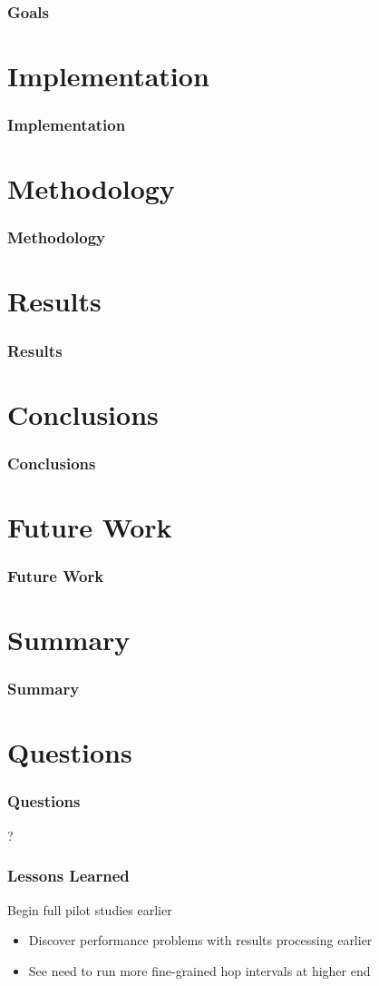 \documentclass{beamer}
\begin{document}
\begin{frame}
	\frametitle{Goals}

\end{frame}

\section{Implementation}
\begin{frame}
	\frametitle{Implementation}

\end{frame}

\section{Methodology}
\begin{frame}
	\frametitle{Methodology}

\end{frame}

\section{Results}
\begin{frame}
	\frametitle{Results}

\end{frame}

\section{Conclusions}
\begin{frame}
	\frametitle{Conclusions}

\end{frame}

\section{Future Work}
\begin{frame}
	\frametitle{Future Work}

\end{frame}

\section{Summary}
\begin{frame}
	\frametitle{Summary}
	\tableofcontents
\end{frame}

\section{Questions}
\begin{frame}
	\frametitle{Questions}
	? 
\end{frame}

\begin{frame}
	\frametitle{Lessons Learned}
	Begin full pilot studies earlier
	\begin{itemize}
	\item Discover performance problems with results processing earlier
	\item See need to run more fine-grained hop intervals at higher end
	\end{itemize}
\end{frame}
\end{document}

